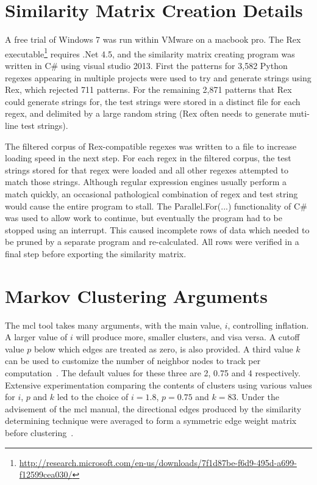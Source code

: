 \section*{Similarity Matrix Creation Details}
\label{app:similarityMatrixCreation}

A free trial of Windows 7 was run within VMware on a macbook pro.  The Rex~ executable\footnote{\scriptsize{\url{http://research.microsoft.com/en-us/downloads/7f1d87be-f6d9-495d-a699-f12599cea030/}}} requires .Net 4.5, and the similarity matrix creating program was written in C\# using visual studio 2013.  First the patterns for 3,582 Python regexes appearing in multiple projects were used to try and generate strings using Rex, which rejected 711 patterns.  For the remaining 2,871 patterns that Rex could generate strings for, the test strings were stored in a distinct file for each regex, and delimited by a large random string (Rex often needs to generate muti-line test strings).

The filtered corpus of Rex-compatible regexes was written to a file to increase loading speed in the next step.  For each regex in the filtered corpus, the test strings stored for that regex were loaded and all other regexes attempted to match those strings.  Although regular expression engines usually perform a match quickly, an occasional pathological combination of regex and test string would cause the entire program to stall.  The Parallel.For(...) functionality of C\# was used to allow work to continue, but eventually the program had to be stopped using an interrupt.  This caused incomplete rows of data which needed to be pruned by a separate program and re-calculated.  All rows were verified in a final step before exporting the similarity matrix.

\section*{Markov Clustering Arguments}
\label{app:mclTuning}

The mcl tool takes many arguments, with the main value, $i$, controlling inflation.  A larger value of $i$ will produce more, smaller clusters, and visa versa.  A cutoff value $p$ below which edges are treated as zero, is also provided.  A third value $k$ can be used to customize the number of neighbor nodes to track per computation~.  The default values for these three are 2, 0.75 and 4 respectively.  Extensive experimentation comparing the contents of clusters using various values for $i$, $p$ and $k$ led to the choice of $i=1.8$, $p=0.75$ and $k=83$.  Under the advisement of the mcl manual, the directional edges produced by the similarity determining technique were averaged to form a symmetric edge weight matrix before clustering~.
